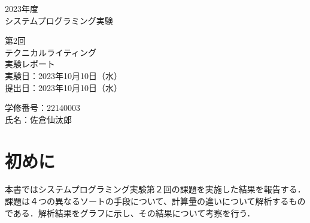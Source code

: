 \documentclass[fleqn, a4paper. 12pt]{ltjsarticle} %
\begin{document}
    \begin{titlepage}
      \begin{center}
      {
      \Huge 2023年度\\システムプログラミング実験}
      
      \vspace{4cm}
             {\Huge 第2回\\テクニカルライティング\\
               実験レポート\\}
             \vspace{4cm}
                    {\large 実験日：2023年10月10日（水）\\提出日：2023年10月10日（水）\\}
                    
                    {\large 学修番号：22140003\\氏名：佐倉仙汰郎}
    \end{center}  
  \end{titlepage}
  \newcommand{\fB}{f_\mathrm{B}}
  \newcommand{\fQ}{f_\mathrm{Q}}
  \newcommand{\fM}{f_\mathrm{M}}
  \newcommand{\fSTL}{f_\mathrm{STL}}

    \section{初めに}
    本書ではシステムプログラミング実験第２回の課題を実施した結果を報告する．課題は４つの異なるソートの手段について、計算量の違いについて解析するものである．解析結果をグラフに示し、その結果について考察を行う．
\end{document}
